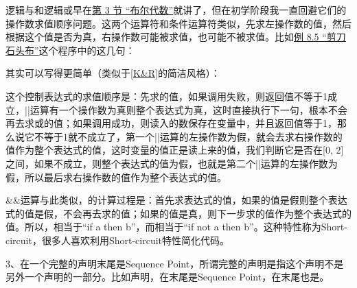 逻辑与和逻辑或早在\hyperlink{db.ch04s03.id2718970}{第 3 节 “布尔代数”}就讲了，但在初学阶段我一直回避它们的操作数求值顺序问题。这两个运算符和条件运算符类似，先求左操作数的值，然后根据这个值是否为真，右操作数可能被求值，也可能不被求值。比如\hyperlink{db.ch08s05.id2735200}{例 8.\BookSplit{}5 “剪刀石头布”}这个程序中的这几句：




其实可以写得更简单（类似于\hyperlink{db.bi01.bibli.kr}{[K\&R]}的简洁风格）：




这个控制表达式的求值顺序是：先求的值，如果调用失败，则返回值不等于1成立，||运算有一个操作数为真则整个表达式为真，这时直接执行下一句，根本不会再去求或的值；如果调用成功，则读入的数保存在变量中，并且返回值等于1，那么说它不等于1就不成立了，第一个||运算的左操作数为假，就会去求右操作数的值作为整个表达式的值，这时变量的值正是读上来的值，我们判断它是否在[0, 2]之间，如果不成立，则整个表达式的值为假，也就是第二个||运算的左操作数为假，所以最后求右操作数的值作为整个表达式的值。



\&\&运算与此类似，的计算过程是：首先求表达式的值，如果的值是假则整个表达式的值是假，不会再去求的值；如果的值是真，则下一步求的值作为整个表达式的值。所以，相当于“if a then b”，而相当于“if not a then b”。这种特性称为Short-circuit，很多人喜欢利用Short-circuit特性简化代码。



3、在一个完整的声明末尾是Sequence Point，所谓完整的声明是指这个声明不是另外一个声明的一部分。比如声明，在末尾是Sequence Point，在末尾也是。




